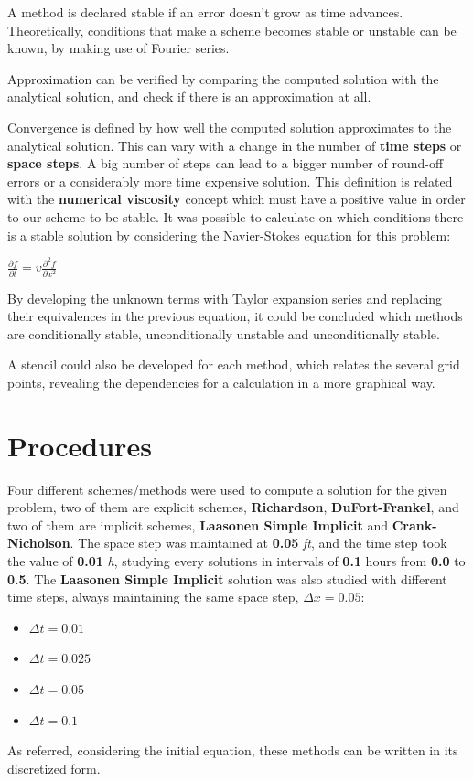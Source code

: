 \documentclass[12pt]{report}
\begin{document}
\par A method is declared stable if an error doesn't grow as time advances. Theoretically, conditions that make a scheme becomes stable or unstable can be known, by making use of Fourier series.
\par Approximation can be verified by comparing the computed solution with the analytical solution, and check if there is an approximation at all.
\par Convergence is defined by how well the computed solution approximates to the analytical solution. This can vary with a change in the number of \textbf{time steps} or \textbf{space steps}. A big number of steps can lead to a bigger number of round-off errors or a considerably more time expensive solution. This definition is related with the \textbf{numerical viscosity} concept which must have a positive value in order to our scheme to be stable. It was possible to calculate on which conditions there is a stable solution by considering the Navier-Stokes equation for this problem:
\begin{center}
\large
$
\frac{\partial f}{\partial t} = v\frac{\partial ^2f}{\partial x ^2}
$
\end{center}
\par By developing the unknown terms with Taylor expansion series and replacing their equivalences in the previous equation, it could be concluded which methods are conditionally stable, unconditionally unstable and unconditionally stable.
\par A stencil could also be developed for each method, which relates the several grid points, revealing the dependencies for a calculation in a more graphical way. 
\section*{Procedures}
Four different schemes/methods were used to compute a solution for the given problem, two of them are explicit schemes, \textbf{Richardson}, \textbf{DuFort-Frankel}, and two of them are implicit schemes, \textbf{Laasonen Simple Implicit} and \textbf{Crank-Nicholson}. The space step was maintained at \textbf{0.05} \textit{ft}, and the time step took the value of \textbf{0.01} \textit{h}, studying every solutions in intervals of \textbf{0.1} hours from \textbf{0.0} to \textbf{0.5}. The \textbf{Laasonen Simple Implicit} solution was also studied with different time steps, always maintaining the same space step,  \textbf{$\Delta x = 0.05$}:
\begin{itemize}[noitemsep] 
\item $ \Delta t = 0.01 $
\item $ \Delta t = 0.025 $
\item $ \Delta t = 0.05 $
\item $ \Delta t = 0.1 $
\end{itemize}
As referred, considering the initial equation, these methods can be written in its discretized form.
\end{document}
